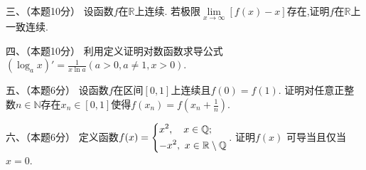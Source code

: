 \documentclass[UTF8,a4paper,10pt]{ctexart}
\begin{document}
\newpage

\noindent 三、（本题10分）
设函数$f$在$\mathbb{R}$上连续. 若极限$\lim\limits_{x \to \infty} [f(x)-x]$存在,证明$f$在$\mathbb{R}$上一致连续.




\vspace{12cm}


\noindent 四、（本题10分）
利用定义证明对数函数求导公式$(\log_ax)'=\frac{1}{x\ln a} (a>0, a\neq 1, x>0)$.




\vspace{8cm}

\newpage



\noindent 五、（本题6分）
设函数$f$在区间$[0, 1]$上连续且$f(0)=f(1)$. 证明对任意正整数$n \in \mathbb{N}$存在$x_n \in [0, 1]$使得$f(x_n)=f(x_n+\frac{1}{n})$.


\vspace{12cm}


\noindent 六、（本题6分）
定义函数$f(x)=\begin{dcases}
x^2,  \ \ \ x \in \mathbb{Q};\\
-x^2,  \ x \in \mathbb{R} \setminus \mathbb{Q}\end{dcases}
$. 证明$f(x)$ 可导当且仅当$x=0$.
\end{document}
